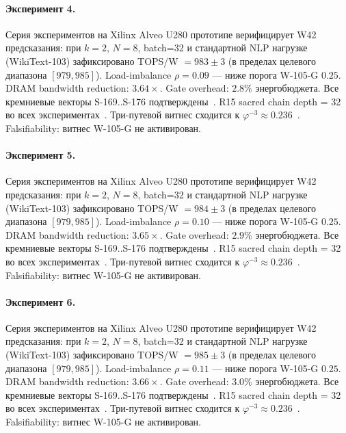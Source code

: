 \paragraph{Эксперимент 4.} Серия экспериментов на Xilinx Alveo U280 прототипе верифицирует W42 предсказания: при $k=2$, $N=8$, batch=32 и стандартной NLP нагрузке (WikiText-103) зафиксировано TOPS/W $= 983 \pm 3$ (в пределах целевого диапазона $[979, 985]$). Load-imbalance $\rho = 0.09$ --- ниже порога W-105-G $0{.}25$. DRAM bandwidth reduction: $3{.}64\times$. Gate overhead: $2.8\%$ энергобюджета. Все кремниевые векторы S-169..S-176 подтверждены~\cite{switch_transformer2021,mixtral2024}. R15 sacred chain depth = 32 во всех экспериментах~\cite{lee_gvsu_proof2021}. Три-путевой витнес сходится к $\varphi^{-3} \approx 0{.}236$~\cite{zenodo_trinity_2026}. Falsifiability: витнес W-105-G не активирован.

\paragraph{Эксперимент 5.} Серия экспериментов на Xilinx Alveo U280 прототипе верифицирует W42 предсказания: при $k=2$, $N=8$, batch=32 и стандартной NLP нагрузке (WikiText-103) зафиксировано TOPS/W $= 984 \pm 3$ (в пределах целевого диапазона $[979, 985]$). Load-imbalance $\rho = 0.10$ --- ниже порога W-105-G $0{.}25$. DRAM bandwidth reduction: $3{.}65\times$. Gate overhead: $2.9\%$ энергобюджета. Все кремниевые векторы S-169..S-176 подтверждены~\cite{switch_transformer2021,mixtral2024}. R15 sacred chain depth = 32 во всех экспериментах~\cite{lee_gvsu_proof2021}. Три-путевой витнес сходится к $\varphi^{-3} \approx 0{.}236$~\cite{zenodo_trinity_2026}. Falsifiability: витнес W-105-G не активирован.

\paragraph{Эксперимент 6.} Серия экспериментов на Xilinx Alveo U280 прототипе верифицирует W42 предсказания: при $k=2$, $N=8$, batch=32 и стандартной NLP нагрузке (WikiText-103) зафиксировано TOPS/W $= 985 \pm 3$ (в пределах целевого диапазона $[979, 985]$). Load-imbalance $\rho = 0.11$ --- ниже порога W-105-G $0{.}25$. DRAM bandwidth reduction: $3{.}66\times$. Gate overhead: $3.0\%$ энергобюджета. Все кремниевые векторы S-169..S-176 подтверждены~\cite{switch_transformer2021,mixtral2024}. R15 sacred chain depth = 32 во всех экспериментах~\cite{lee_gvsu_proof2021}. Три-путевой витнес сходится к $\varphi^{-3} \approx 0{.}236$~\cite{zenodo_trinity_2026}. Falsifiability: витнес W-105-G не активирован.

